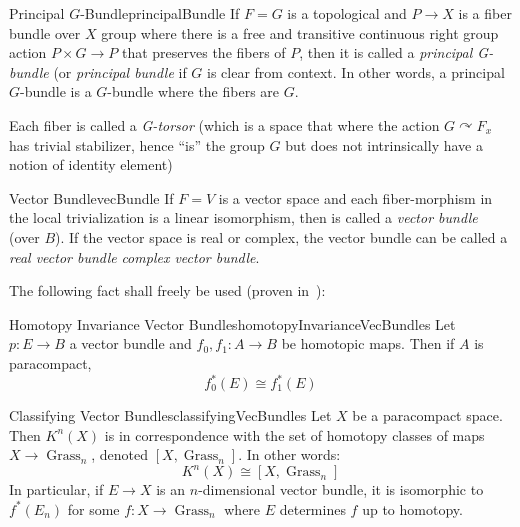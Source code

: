 \documentclass{book}
\newcommand{\Grass}{{\operatorname{Grass}}}
\newcommand{\actson}{\curvearrowright}
\newcommand{\qn}{\quad\newline}
\begin{document}
\begin{defn}{Principal $G$-Bundle}{principalBundle}
	If $F = G$ is a topological and $P \to X$ is a fiber bundle over $X$ group where there is a free and
	transitive continuous
	right group action $P\times G \to P$ that preserves the fibers of $P$, then it is called a \emph{principal
	G-bundle} (or \emph{principal bundle} if $G$ is clear from context. In other words, a principal $G$-bundle
  is a $G$-bundle where the fibers are $G$.

	\qn
	Each fiber is called a \emph{G-torsor} (which is a space that where the action $G\actson F_x$ has trivial
	stabilizer, hence ``is'' the group $G$ but does not intrinsically have a notion of identity element)
\end{defn}

\begin{defn}{Vector Bundle}{vecBundle}
	If $F =V$ is a vector space and each
	fiber-morphism in the local trivialization is a linear isomorphism, then is called a \emph{vector bundle}
	(over $B$). If the vector space is real or complex, the vector bundle can be called a \emph{real vector
	bundle} \emph{complex vector bundle}.
\end{defn}

The following fact shall freely be used (proven in~\cite{NateKTheory}):

\begin{thm}{Homotopy Invariance Vector Bundles}{homotopyInvarianceVecBundles}
	Let $p: E \to B$ a vector bundle and $f_0,f_1: A \to B$ be homotopic maps. Then if $A$ is paracompact,
	\[
		f_0^*(E) \cong f_1^*(E)
	\]
\end{thm}

\begin{Proof}
  \cite[section~1.2]{NateKTheory}
\end{Proof}

\begin{thm}{Classifying Vector Bundles}{classifyingVecBundles}
	Let $X$ be a paracompact space. Then $K^n(X)$ is in correspondence with the set of homotopy
	classes of maps $X \to \Grass_n$, denoted $[X, \Grass_n]$. In other words:
	\[
		K^n(X) \cong [X,\Grass_n]
	\]
	In particular, if $E \to X$ is an $n$-dimensional vector bundle, it is isomorphic to $f^*(E_n)$ for some
	$f: X \to \Grass_n$ where $E$ determines $f$ up to homotopy.
\end{thm}
\end{document}
